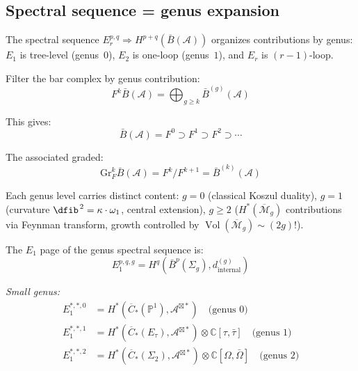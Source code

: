 \subsection{Spectral sequence = genus expansion}

\begin{remark}
\label{princ:ss-genus}
The spectral sequence $E_r^{p,q} \Rightarrow H^{p+q}(\bar{B}(\mathcal{A}))$ organizes contributions by genus: $E_1$ is tree-level (genus~$0$), $E_2$ is one-loop (genus~$1$), and $E_r$ is $(r{-}1)$-loop.
\end{remark}

\begin{definition}
\label{def:genus-filtration-complete}
Filter the bar complex by genus contribution:
\begin{equation}
F^k \bar{B}(\mathcal{A}) = \bigoplus_{g \geq k} \bar{B}^{(g)}(\mathcal{A})
\end{equation}

This gives:
\begin{equation}
\bar{B}(\mathcal{A}) = F^0 \supset F^1 \supset F^2 \supset \cdots
\end{equation}

The associated graded:
\begin{equation}
\text{Gr}^k_F \bar{B}(\mathcal{A}) = F^k / F^{k+1} = \bar{B}^{(k)}(\mathcal{A})
\end{equation}
\end{definition}

\begin{remark}
\label{rem:genus-fundamental-parameter}
Each genus level carries distinct content: $g=0$ (classical Koszul
duality), $g=1$ (curvature $\dfib^{\,2}=\kappa\cdot\omega_1$,
central extension), $g\geq 2$ ($H^*(\overline{\mathcal{M}}_g)$
contributions via Feynman transform, growth controlled by
$\operatorname{Vol}(\overline{\mathcal{M}}_g)\sim(2g)!$).
\end{remark}

\begin{theorem}
\label{thm:e1-page-complete}
The $E_1$ page of the genus spectral sequence is:
\begin{equation}
E_1^{p,q,g} = H^q\left(\bar{B}^p(\Sigma_g), d^{(g)}_{\mathrm{internal}}\right)
\end{equation}

\emph{Small genus:}
\begin{align}
E_1^{*,*,0} &= H^*(\overline{C}_*(\mathbb{P}^1), \mathcal{A}^{\boxtimes *}) \quad \text{(genus 0)} \\
E_1^{*,*,1} &= H^*(\overline{C}_*(E_\tau), \mathcal{A}^{\boxtimes *}) \otimes \mathbb{C}[\tau, \bar{\tau}] \quad \text{(genus 1)} \\
E_1^{*,*,2} &= H^*(\overline{C}_*(\Sigma_2), \mathcal{A}^{\boxtimes *}) \otimes \mathbb{C}[\Omega, \bar{\Omega}] \quad \text{(genus 2)}
\end{align}
\end{theorem}


